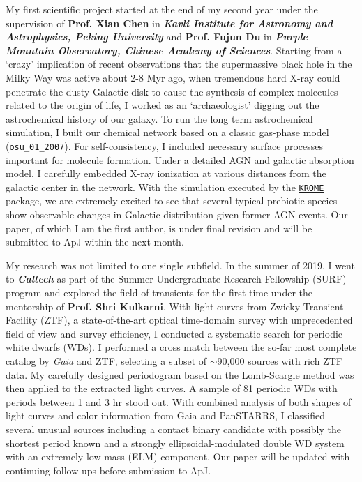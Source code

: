 \documentclass[12pt, a4paper]{awesome-cv} %
\begin{document}
\begin{cvletter}
My first scientific project started at the end of my second year under the supervision of \textbf{Prof. Xian Chen} in \textbf{\textit{Kavli Institute for Astronomy and Astrophysics, Peking University}} and \textbf{Prof. Fujun Du} in \textbf{\textit{Purple Mountain Observatory, Chinese Academy of Sciences}}. Starting from a `crazy' implication of recent observations that the supermassive black hole in the Milky Way was active about 2-8 Myr ago, when tremendous hard X-ray could penetrate the dusty Galactic disk to cause the synthesis of complex molecules related to the origin of life, I worked as an `archaeologist' digging out the astrochemical history of our galaxy. To run the long term astrochemical simulation, I built our chemical network based on a classic gas-phase model (\href{http://faculty.virginia.edu/ericherb/research_files/osu_01_2007}{\texttt{osu\_01\_2007}}). For self-consistency, I included necessary surface processes important for molecule formation. Under a detailed AGN and galactic absorption model, I carefully embedded X-ray ionization at various distances from the galactic center in the network. With the simulation executed by the \href{http://kromepackage.org}{\texttt{KROME}} package, we are extremely excited to see that several typical prebiotic species show observable changes in Galactic distribution given former AGN events. Our paper, of which I am the first author, is under final revision and will be submitted to ApJ within the next month.

My research was not limited to one single subfield. In the summer of 2019, I went to \textbf{\textit{Caltech}} as part of the Summer Undergraduate Research Fellowship (SURF) program and explored the field of transients for the first time under the mentorship of \textbf{Prof. Shri Kulkarni}. With light curves from Zwicky Transient Facility (ZTF), a state-of-the-art optical time-domain survey with unprecedented field of view and survey efficiency, I conducted a systematic search for periodic white dwarfs (WDs). I performed a cross match between the so-far most complete catalog by \textit{Gaia} and ZTF, selecting a subset of $\sim$90,000 sources with rich ZTF data. My carefully designed periodogram based on the Lomb-Scargle method was then applied to the extracted light curves. A sample of 81 periodic WDs with periods between 1 and 3 hr stood out. With combined analysis of both shapes of light curves and color information from Gaia and PanSTARRS, I classified several unusual sources including a contact binary candidate with possibly the shortest period known and a strongly ellipsoidal-modulated double WD system with an extremely low-mass (ELM) component. Our paper will be updated with continuing follow-ups before submission to ApJ.


\end{cvletter}
\end{document}
